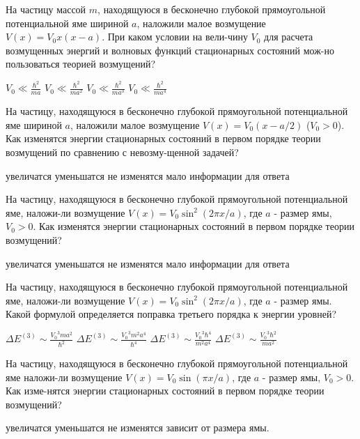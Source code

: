 \documentclass[11pt,a4paper]{exam}
\begin{document}
\begin{questions}
\question На частицу массой $m$, находящуюся в бесконечно глубокой прямоугольной потенциальной яме шириной $a$, наложили малое возмущение $V(x) = {V_0}x(x - a)$. При каком условии на вели-чину ${V_0}$ для расчета возмущенных энергий и волновых функций стационарных состояний мож-но пользоваться теорией возмущений?
\begin{choices}
\choice ${V_0} \ll \frac{{{\hbar ^2}}}{{ma}}$     
\choice ${V_0} \ll \frac{{{\hbar ^2}}}{{m{a^2}}}$    
\choice ${V_0} \ll \frac{{{\hbar ^2}}}{{m{a^3}}}$    
\choice ${V_0} \ll \frac{{{\hbar ^2}}}{{m{a^4}}}$
\end{choices}

\question На частицу, находящуюся в бесконечно глубокой прямоугольной потенциальной яме шириной $a$, наложили малое возмущение $V(x) = {V_0}(x - a/2)$ (${V_0} > 0$). Как изменятся энергии стационарных состояний в первом порядке теории возмущений по сравнению с невозму-щенной задачей?
\begin{choices}
\choice увеличатся     
\choice уменьшатся  
\choice не изменятся   
\choice мало информации для ответа
\end{choices}

\question На частицу, находящуюся в бесконечно глубокой прямоугольной потенциальной яме, наложи-ли возмущение $V(x) = {V_0}{\sin ^2}\left( {2\pi x/a} \right)$, где $a$ - размер ямы, ${V_0} > 0$. Как изменятся энергии стационарных состояний в первом порядке теории возмущений?
\begin{choices}
\choice увеличатся     
\choice уменьшатся  
\choice не изменятся   
\choice мало информации для ответа
\end{choices}

\question На частицу, находящуюся в бесконечно глубокой прямоугольной потенциальной яме, наложи-ли возмущение $V(x) = {V_0}{\sin ^2}\left( {2\pi x/a} \right)$, где $a$ - размер ямы. Какой формулой определяется поправка третьего порядка к энергии уровней?
\begin{choices}
\choice $\Delta {E^{(3)}} \sim \frac{{{V_0}^3m{a^2}}}{{{\hbar ^2}}}$   
\choice $\Delta {E^{(3)}} \sim \frac{{{V_0}^3{m^2}{a^4}}}{{{\hbar ^4}}}$  
\choice $\Delta {E^{(3)}} \sim \frac{{{V_0}^3{\hbar ^4}}}{{{m^2}{a^4}}}$  
\choice $\Delta {E^{(3)}} \sim \frac{{{V_0}^3{\hbar ^2}}}{{m{a^2}}}$
\end{choices}

\question На частицу, находящуюся в бесконечно глубокой прямоугольной потенциальной яме наложи-ли возмущение $V(x) = {V_0}\sin \left( {\pi x/a} \right)$, где $a$ - размер ямы, ${V_0} > 0$. Как изме-нятся энергии стационарных состояний в первом порядке теории возмущений?
\begin{choices}
\choice увеличатся     
\choice уменьшатся  
\choice не изменятся   
\choice зависит от размера ямы.
\end{choices}


\end{questions}
\end{document}

